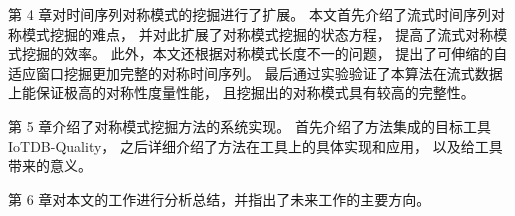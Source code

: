 第 4 章对时间序列对称模式的挖掘进行了扩展。
本文首先介绍了流式时间序列对称模式挖掘的难点，
并对此扩展了对称模式挖掘的状态方程，
提高了流式对称模式挖掘的效率。
此外，本文还根据对称模式长度不一的问题，
提出了可伸缩的自适应窗口挖掘更加完整的对称时间序列。
最后通过实验验证了本算法在流式数据上能保证极高的对称性度量性能，
且挖掘出的对称模式具有较高的完整性。

第 5 章介绍了对称模式挖掘方法的系统实现。
首先介绍了方法集成的目标工具 IoTDB-Quality，
之后详细介绍了方法在工具上的具体实现和应用，
以及给工具带来的意义。

第 6 章对本文的工作进行分析总结，并指出了未来工作的主要方向。 
